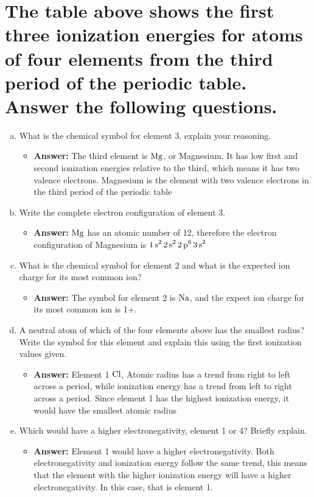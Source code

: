\documentclass{scrartcl}
\begin{document}
\section{The table above shows the first three ionization energies for atoms of four elements from the third period of the periodic table. Answer the following questions.}
\label{sec:org92c8d50}
\begin{enumerate}[(a)]
\item What is the chemical symbol for element 3, explain your reasoning.
\begin{itemize}
\item \textbf{Answer:} The third element is \(\ce{Mg}\), or Magnesium. It has low first and
second ionization energies relative to the third, which means it has
two valence electrons. Magnesium is the element with two valence
electrons in the third period of the periodic table
\end{itemize}

\item Write the complete electron configuration of element 3.
\begin{itemize}
\item \textbf{Answer:} \(\ce{Mg}\) has an atomic number of 12, therefore the electron configuration
of Magnesium is \(\ce{1s^2 2s^2 2p^6 3s^2}\)
\end{itemize}

\item What is the chemical symbol for element 2 and what is the expected ion charge for its most common ion?
\begin{itemize}
\item \textbf{Answer:} The symbol for element 2 is \(\ce{Na}\), and the expect ion charge for its most common ion is 1+.
\end{itemize}

\item A neutral atom of which of the four elements above has the smallest radius? Write the symbol for this element and explain this using the first ionization values given.
\begin{itemize}
\item \textbf{Answer:} Element 1 \(\ce{Cl}\), Atomic radius has a trend from right to left across a period, while ionization energy has a trend from left to right across a period. Since element 1 has the highest ionization energy, it would have the smallest atomic radius
\end{itemize}

\item Which would have a higher electronegativity, element 1 or 4? Briefly explain.
\begin{itemize}
\item \textbf{Answer:} Element 1 would have a higher electronegativity. Both electronegativity and ionization energy follow the same trend, this means that the element with the higher ionization energy will have a higher electronegativity. In this case, that is element 1.
\end{itemize}


\end{enumerate}
\end{document}
